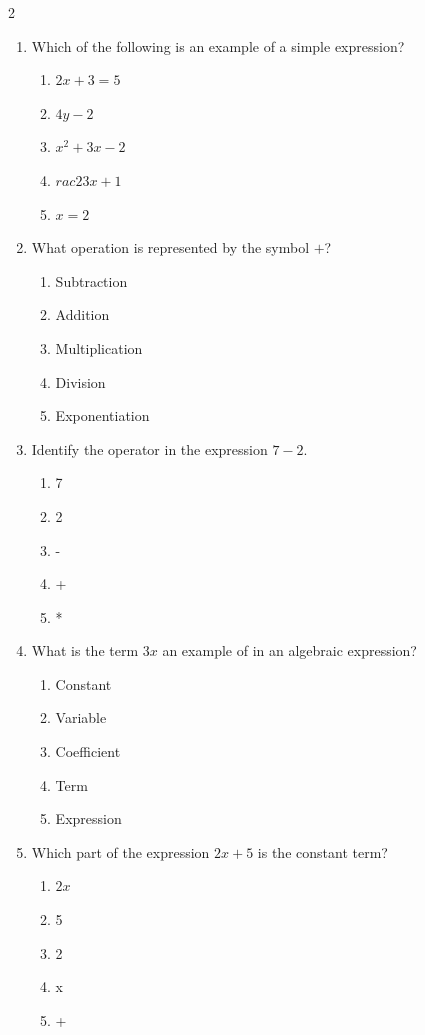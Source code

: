 \documentclass[10pt]{article}
\begin{document}
\begin{multicols}{2}
\begin{enumerate}[label=\textbf{Q\arabic*.}, leftmargin=*, itemsep=6pt, parsep=0pt]
  \item \small Which of the following is an example of a simple expression?
  \begin{enumerate}[label=(\Alph*), leftmargin=0.6cm, nosep, itemsep=2pt]
    \item $2x + 3 = 5$
    \item $4y - 2$
    \item $x^2 + 3x - 2$
    \item $rac{2}{3}x + 1$
    \item $x = 2$
  \end{enumerate}

  \item \small What operation is represented by the symbol $+$?
  \begin{enumerate}[label=(\Alph*), leftmargin=0.6cm, nosep, itemsep=2pt]
    \item Subtraction
    \item Addition
    \item Multiplication
    \item Division
    \item Exponentiation
  \end{enumerate}

  \item \small Identify the operator in the expression $7 - 2$.
  \begin{enumerate}[label=(\Alph*), leftmargin=0.6cm, nosep, itemsep=2pt]
    \item 7
    \item 2
    \item -
    \item +
    \item *
  \end{enumerate}

  \item \small What is the term $3x$ an example of in an algebraic expression?
  \begin{enumerate}[label=(\Alph*), leftmargin=0.6cm, nosep, itemsep=2pt]
    \item Constant
    \item Variable
    \item Coefficient
    \item Term
    \item Expression
  \end{enumerate}

  \item \small Which part of the expression $2x + 5$ is the constant term?
  \begin{enumerate}[label=(\Alph*), leftmargin=0.6cm, nosep, itemsep=2pt]
    \item $2x$
    \item 5
    \item 2
    \item x
    \item +
  \end{enumerate}

\end{enumerate}
\end{multicols}
\end{document}
